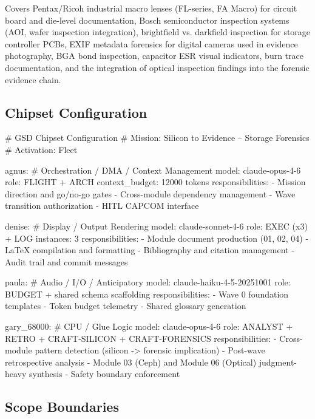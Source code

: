 \documentclass[11pt,letterpaper]{article}
\begin{document}
Covers Pentax/Ricoh industrial macro lenses (FL-series, FA Macro) for circuit board and die-level documentation, Bosch semiconductor inspection systems (AOI, wafer inspection integration), brightfield vs. darkfield inspection for storage controller PCBs, EXIF metadata forensics for digital cameras used in evidence photography, BGA bond inspection, capacitor ESR visual indicators, burn trace documentation, and the integration of optical inspection findings into the forensic evidence chain.

\subsection{Chipset Configuration}

\begin{asciibox}
# GSD Chipset Configuration
# Mission: Silicon to Evidence -- Storage Forensics
# Activation: Fleet

agnus:        # Orchestration / DMA / Context Management
  model: claude-opus-4-6
  role: FLIGHT + ARCH
  context_budget: 12000 tokens
  responsibilities:
    - Mission direction and go/no-go gates
    - Cross-module dependency management
    - Wave transition authorization
    - HITL CAPCOM interface

denise:       # Display / Output Rendering
  model: claude-sonnet-4-6
  role: EXEC (x3) + LOG
  instances: 3
  responsibilities:
    - Module document production (01, 02, 04)
    - LaTeX compilation and formatting
    - Bibliography and citation management
    - Audit trail and commit messages

paula:        # Audio / I/O / Anticipatory
  model: claude-haiku-4-5-20251001
  role: BUDGET + shared schema scaffolding
  responsibilities:
    - Wave 0 foundation templates
    - Token budget telemetry
    - Shared glossary generation

gary_68000:   # CPU / Glue Logic
  model: claude-opus-4-6
  role: ANALYST + RETRO + CRAFT-SILICON + CRAFT-FORENSICS
  responsibilities:
    - Cross-module pattern detection (silicon -> forensic implication)
    - Post-wave retrospective analysis
    - Module 03 (Ceph) and Module 06 (Optical) judgment-heavy synthesis
    - Safety boundary enforcement
\end{asciibox}

\subsection{Scope Boundaries}
\end{document}
